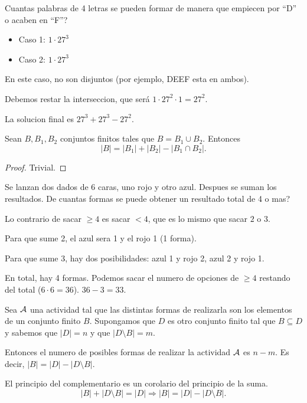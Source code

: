 \begin{example}
	Cuantas palabras de 4 letras se pueden formar de manera que empiecen por ``D'' o acaben en ``F''?
	
	\begin{itemize}
		\item Caso 1: \(1 \cdot 27^{3}\)
		\item Caso 2: \(1 \cdot 27^{3 } \)
	\end{itemize}
	En este caso, no son disjuntos (por ejemplo, DEEF esta en ambos).
	
	Debemos restar la interseccion, que será \(1 \cdot 27^{2} \cdot 1 = 27^{2}  \).
	
	La solucion final es \(27^{3} + 27^{3} - 27^{2}\).
\end{example}

\begin{theorem}
	Sean \(B, B_1, B_2 \) conjuntos finitos tales que \(B= B_1 \cup B_2 \). Entonces
	\[
		|B| = |B_1| + |B_2| - |B_1 \cap B_2|.
	\]
\end{theorem}
\begin{proof}
	Trivial.
\end{proof}

\begin{example}
	Se lanzan dos dados de 6 caras, uno rojo y otro azul. Despues se suman los resultados. De cuantas formas se puede obtener un resultado total de 4 o mas?
	
	Lo contrario de sacar \(\geq  4 \) es sacar \(< 4 \), que es lo mismo que sacar \(2 \) o \(3 \).
	
	Para que sume 2, el azul sera 1 y el rojo 1 (1 forma).
	
	Para que sume 3, hay dos posibilidades: azul 1 y rojo 2, azul 2 y rojo 1.
	
	En total, hay 4 formas. Podemos sacar el numero de opciones de \(\geq  4 \) restando del total (\(6 \cdot 6 = 36\)). \(36 - 3 = 33 \).
\end{example}

\begin{proposition}
	Sea \(\mathcal{\MakeUppercase{a}} \) una actividad tal que las distintas formas de realizarla son los elementos de un conjunto finito \(B\). Supongamos que \(D \) es otro conjunto finito tal que \(B \subseteq D \) y sabemos que \(|D| = n \) y que \(|D \setminus B| = m\).
	
	Entonces el numero de posibles formas de realizar la actividad \(\mathcal{\MakeUppercase{a}} \) es \(n - m \). Es decir, \(|B| = |D| - |D \setminus B| \).
\end{proposition}
\begin{remark}
	El principio del complementario es un corolario del principio de la suma.
	\[
		|B| + |D \setminus B| = |D| \Rightarrow |B| = |D| - |D \setminus B|.
	\]
\end{remark}

